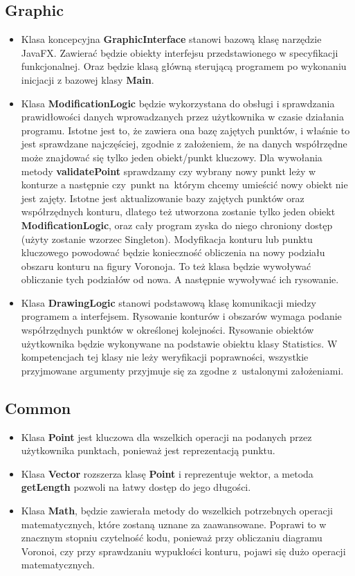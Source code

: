 \documentclass[a4paper,11pt]{article}
\begin{document}
\subsection{Graphic}
\begin{itemize}
\item Klasa koncepcyjna \textbf{GraphicInterface} stanowi bazową klasę narzędzie JavaFX. Zawierać będzie obiekty interfejsu przedstawionego w specyfikacji funkcjonalnej. Oraz będzie klasą główną sterującą programem po wykonaniu inicjacji z bazowej klasy \textbf{Main}.
\item Klasa \textbf{ModificationLogic} będzie wykorzystana do obsługi i sprawdzania prawidłowości danych wprowadzanych przez użytkownika w czasie działania programu. Istotne jest to, że zawiera ona bazę zajętych punktów, i właśnie to jest sprawdzane najczęściej, zgodnie z założeniem, że na danych współrzędne może znajdować się tylko jeden obiekt/punkt kluczowy. Dla wywołania metody \textbf{validatePoint} sprawdzamy czy wybrany nowy punkt leży w konturze a następnie czy~punkt na~którym chcemy umieścić nowy obiekt nie jest zajęty. Istotne jest aktualizowanie bazy zajętych punktów oraz współrzędnych konturu, dlatego też utworzona zostanie tylko jeden obiekt \textbf{ModificationLogic}, oraz cały program zyska do niego chroniony dostęp (użyty zostanie wzorzec Singleton). Modyfikacja konturu lub punktu kluczowego powodować będzie konieczność obliczenia na nowy podziału obszaru konturu na figury Voronoja. To też klasa będzie wywoływać obliczanie tych podziałów od nowa. A następnie wywoływać ich rysowanie.
\item Klasa \textbf{DrawingLogic} stanowi podstawową klasę komunikacji miedzy programem a interfejsem. Rysowanie konturów i obszarów wymaga podanie współrzędnych punktów w określonej kolejności. Rysowanie obiektów użytkownika będzie wykonywane na podstawie obiektu klasy Statistics. W kompetencjach tej klasy nie leży weryfikacji poprawności, wszystkie przyjmowane argumenty przyjmuje się za zgodne z~ustalonymi założeniami. 
\end{itemize}

\subsection{Common}
\begin{itemize}
\item Klasa \textbf{Point} jest kluczowa dla wszelkich operacji na podanych przez użytkownika punktach, ponieważ jest reprezentacją punktu.
\item Klasa \textbf{Vector} rozszerza klasę \textbf{Point} i reprezentuje wektor, a metoda \textbf{getLength} pozwoli na łatwy dostęp do jego długości.
\item Klasa \textbf{Math}, będzie zawierała metody do wszelkich potrzebnych operacji matematycznych, które zostaną uznane za zaawansowane. Poprawi to w znacznym stopniu czytelność kodu, ponieważ przy obliczaniu diagramu Voronoi, czy przy sprawdzaniu wypukłości konturu, pojawi się dużo operacji matematycznych.
\end{itemize}
\end{document}
